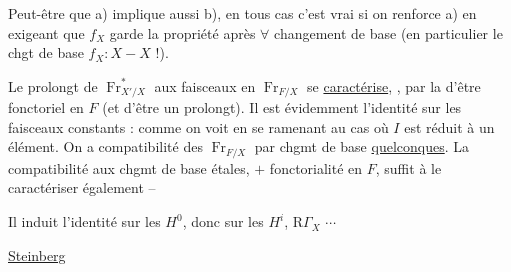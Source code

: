 Peut-être que a) implique aussi b), en tous cas c'est vrai si on renforce a) en exigeant que $f_X$ garde la propriété  après \uline{$\forall$} changement de base (en particulier le chgt de base $f_X:X\mathbin{-}X$ !).

Le prolongt de $\operatorname{Fr}_{X'/X}^*$  aux faisceaux en $\operatorname{Fr}_{F/X}$ se \uline{caractérise}, , par la  d'être fonctoriel en $F$ (et d'être un prolongt). Il est évidemment l'identité sur les faisceaux constants :
comme on voit en se ramenant au cas où $I$ est réduit à un élément. On a  compatibilité des $\operatorname{Fr}_{F/X}$ par chgmt de base \uline{quelconques}. La compatibilité aux chgmt de base étales, $+$ fonctorialité en $F$, suffit à le caractériser également -- 

Il induit l'identité sur les $H^0$, donc sur les $H^i$, $\mathrm R\Gamma_X$ $\cdots$



\uline{Steinberg}

